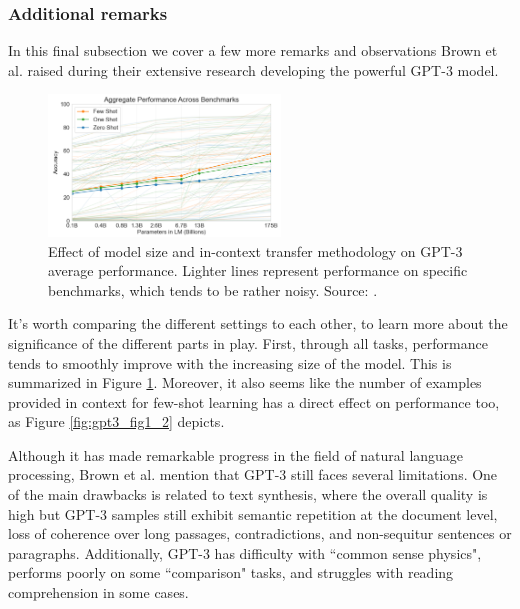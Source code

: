 \documentclass{article}
\begin{document}
\subsubsection{Additional remarks}
\label{subsec:gpt3-more}

In this final subsection we cover a few more remarks and observations Brown et al. raised during their extensive research developing the powerful GPT-3 model.

\begin{figure}
    \centering
    \vspace{-2mm}
    \includegraphics[width=0.55\textwidth]{figures/gpt3_fig1_3.png}
    \caption{
        Effect of model size and in-context transfer methodology on GPT-3 average performance. Lighter lines represent performance on specific benchmarks, which tends to be rather noisy. Source: \citet{brown2020gpt3}.
    }
    \label{fig:gpt3_fig1_3}
    \vspace{0mm}
\end{figure}

\medskip
\noindent
It's worth comparing the different settings to each other, to learn more about the significance of the different parts in play. First, through all tasks, performance tends to smoothly improve with the increasing size of the model. This is summarized in Figure \ref{fig:gpt3_fig1_3}. Moreover, it also seems like the number of examples provided in context for few-shot learning has a direct effect on performance too, as Figure \ref{fig:gpt3_fig1_2} depicts.

\medskip
\noindent
Although it has made remarkable progress in the field of natural language processing, Brown et al. mention that GPT-3 still faces several limitations. One of the main drawbacks is related to text synthesis, where the overall quality is high but GPT-3 samples still exhibit semantic repetition at the document level, loss of coherence over long passages, contradictions, and non-sequitur sentences or paragraphs. Additionally, GPT-3 has difficulty with ``common sense physics", performs poorly on some ``comparison" tasks, and struggles with reading comprehension in some cases.
\end{document}
